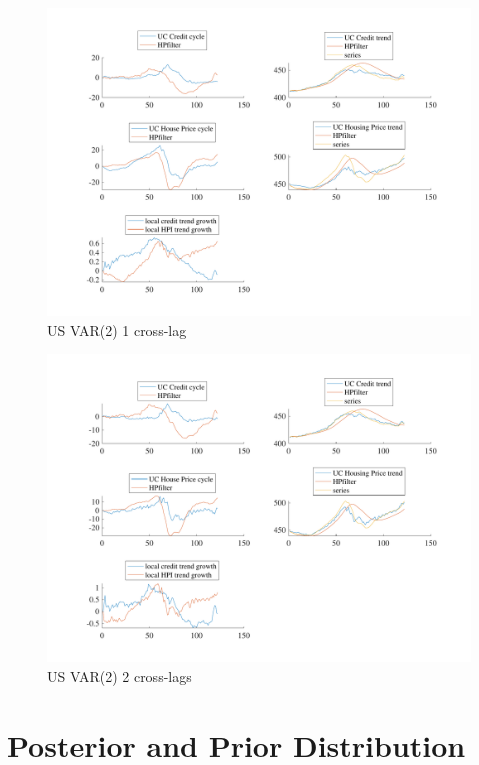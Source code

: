 \documentclass[
  12pt,
]{article}
\begin{document}
\begin{figure}

{\centering \includegraphics[width=0.85\linewidth]{../../Regression/Bayesian_UC_VAR2_drift_Crosscycle1lag/OutputData/cycles_US} 

}

\caption{US VAR(2) 1 cross-lag}\label{fig:unnamed-chunk-7}
\end{figure}

\begin{figure}

{\centering \includegraphics[width=0.85\linewidth]{../../Regression/Bayesian_UC_VAR2_drift_Crosscycle2lags/OutputData/cycles_US} 

}

\caption{US VAR(2) 2 cross-lags}\label{fig:unnamed-chunk-8}
\end{figure}

\clearpage

\hypertarget{posterior-and-prior-distribution}{%
\section{Posterior and Prior Distribution}\label{posterior-and-prior-distribution}}
\end{document}
